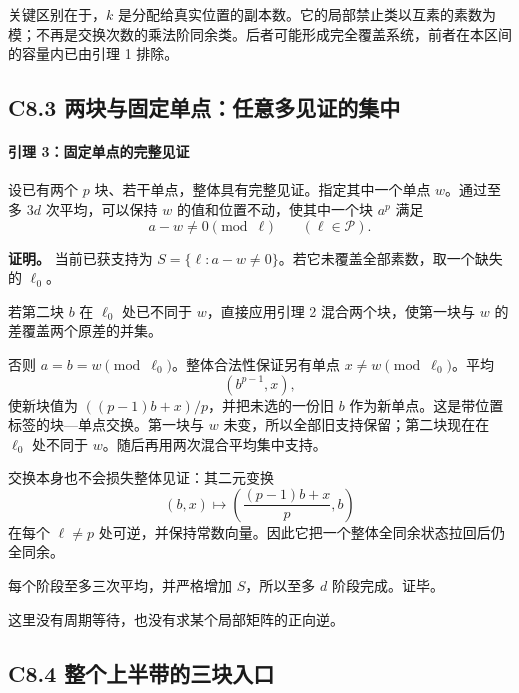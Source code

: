 {关键区别在于，}\(k\) {是分配给真实位置的副本数。它的局部禁止类以互素的素数为模；不再是交换次数的乘法阶同余类。后者可能形成完全覆盖系统，前者在本区间的容量内已由引理} {1} {排除。}

\subsection*{\texorpdfstring{{C8.3} {两块与固定单点：任意多见证的集中}}{C8.3 两块与固定单点：任意多见证的集中}}\label{C8-h49}

\paragraph*{\texorpdfstring{{引理} {3：固定单点的完整见证}}{引理 3：固定单点的完整见证}}\label{C8-h50}

{设已有两个} \(p\) {块、若干单点，整体具有完整见证。指定其中一个单点} \(w\){。通过至多} \(3d\) {次平均，可以保持} \(w\) {的值和位置不动，使其中一个块} \(a^p\) {满足} \[
a-w\ne0\pmod\ell\qquad(\ell\in\mathcal P).
\tag{C8.6}
\]

\textbf{{证明。}} {当前已获支持为} \(S=\{\ell:a-w\ne0\}\){。若它未覆盖全部素数，取一个缺失的} \(\ell_0\){。}

{若第二块} \(b\) {在} \(\ell_0\) {处已不同于} \(w\){，直接应用引理} {2} {混合两个块，使第一块与} \(w\) {的差覆盖两个原差的并集。}

{否则} \(a=b=w\pmod{\ell_0}\){。整体合法性保证另有单点} \(x\ne w\pmod{\ell_0}\){。平均} \[
(b^{p-1},x),
\] {使新块值为} \(((p-1)b+x)/p\){，并把未选的一份旧} \(b\) {作为新单点。这是带位置标签的块---单点交换。第一块与} \(w\) {未变，所以全部旧支持保留；第二块现在在} \(\ell_0\) {处不同于} \(w\){。随后再用两次混合平均集中支持。}

{交换本身也不会损失整体见证：其二元变换} \[
(b,x)\mapsto\left(\frac{(p-1)b+x}{p},b\right)
\] {在每个} \(\ell\ne p\) {处可逆，并保持常数向量。因此它把一个整体全同余状态拉回后仍全同余。}

{每个阶段至多三次平均，并严格增加} \(S\){，所以至多} \(d\) {阶段完成。证毕。}

{这里没有周期等待，也没有求某个局部矩阵的正向逆。}

\subsection*{\texorpdfstring{{C8.4} {整个上半带的三块入口}}{C8.4 整个上半带的三块入口}}\label{C8-h51}

